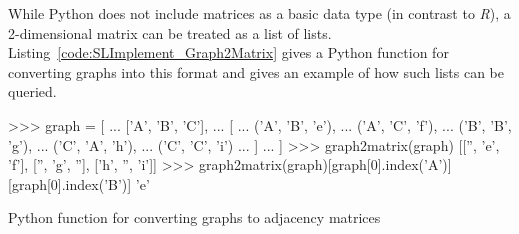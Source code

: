%
While Python does not include matrices as a basic data type (in contrast to \emph{R}), a 2-dimensional matrix can be treated as a list of lists.
Listing~\ref{code:SLImplement_Graph2Matrix} gives a Python function for converting graphs into this format and gives an example of how such lists can be queried.
%
\begin{listing}[tbph]

\medskip
\begin{pythoncode}
    >>> graph = [
    ...     ['A', 'B', 'C'],
    ...     [
    ...         ('A', 'B', 'e'),
    ...         ('A', 'C', 'f'),
    ...         ('B', 'B', 'g'),
    ...         ('C', 'A', 'h'),
    ...         ('C', 'C', 'i')
    ...     ]
    ... ]
    >>> graph2matrix(graph)
    [['', 'e', 'f'], ['', 'g', ''], ['h', '', 'i']]
    >>> graph2matrix(graph)[graph[0].index('A')][graph[0].index('B')]
    'e'
\end{pythoncode}
\caption{Python function for converting graphs to adjacency matrices}
\label{code:SLImplement_Graph2Matrix}
\end{listing}

